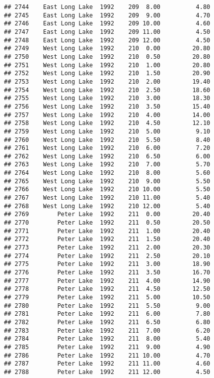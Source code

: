 \documentclass[
]{article}
\begin{document}
\begin{verbatim}
## 2744    East Long Lake  1992    209  8.00          4.80
## 2745    East Long Lake  1992    209  9.00          4.70
## 2746    East Long Lake  1992    209 10.00          4.60
## 2747    East Long Lake  1992    209 11.00          4.50
## 2748    East Long Lake  1992    209 12.00          4.50
## 2749    West Long Lake  1992    210  0.00         20.80
## 2750    West Long Lake  1992    210  0.50         20.80
## 2751    West Long Lake  1992    210  1.00         20.80
## 2752    West Long Lake  1992    210  1.50         20.90
## 2753    West Long Lake  1992    210  2.00         19.40
## 2754    West Long Lake  1992    210  2.50         18.60
## 2755    West Long Lake  1992    210  3.00         18.30
## 2756    West Long Lake  1992    210  3.50         15.40
## 2757    West Long Lake  1992    210  4.00         14.00
## 2758    West Long Lake  1992    210  4.50         12.10
## 2759    West Long Lake  1992    210  5.00          9.10
## 2760    West Long Lake  1992    210  5.50          8.40
## 2761    West Long Lake  1992    210  6.00          7.20
## 2762    West Long Lake  1992    210  6.50          6.00
## 2763    West Long Lake  1992    210  7.00          5.70
## 2764    West Long Lake  1992    210  8.00          5.60
## 2765    West Long Lake  1992    210  9.00          5.50
## 2766    West Long Lake  1992    210 10.00          5.50
## 2767    West Long Lake  1992    210 11.00          5.40
## 2768    West Long Lake  1992    210 12.00          5.40
## 2769        Peter Lake  1992    211  0.00         20.40
## 2770        Peter Lake  1992    211  0.50         20.50
## 2771        Peter Lake  1992    211  1.00         20.40
## 2772        Peter Lake  1992    211  1.50         20.40
## 2773        Peter Lake  1992    211  2.00         20.30
## 2774        Peter Lake  1992    211  2.50         20.10
## 2775        Peter Lake  1992    211  3.00         18.90
## 2776        Peter Lake  1992    211  3.50         16.70
## 2777        Peter Lake  1992    211  4.00         14.90
## 2778        Peter Lake  1992    211  4.50         12.50
## 2779        Peter Lake  1992    211  5.00         10.50
## 2780        Peter Lake  1992    211  5.50          9.00
## 2781        Peter Lake  1992    211  6.00          7.80
## 2782        Peter Lake  1992    211  6.50          6.80
## 2783        Peter Lake  1992    211  7.00          6.20
## 2784        Peter Lake  1992    211  8.00          5.40
## 2785        Peter Lake  1992    211  9.00          4.90
## 2786        Peter Lake  1992    211 10.00          4.70
## 2787        Peter Lake  1992    211 11.00          4.60
## 2788        Peter Lake  1992    211 12.00          4.50

\end{verbatim}
\end{document}
